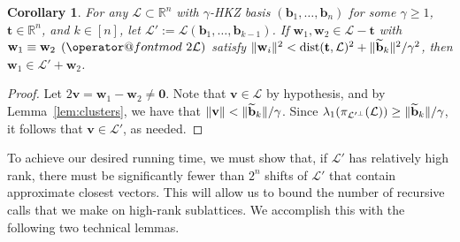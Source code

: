 \documentclass[11pt]{article}
\makeatletter
\newtheorem{corollary}[theorem]{Corollary}
\newcommand{\R}{\ensuremath{\mathbb{R}}}
\renewcommand{\vec}[1]{\ensuremath{\mathbf{#1}}}
\def\imod#1{\allowbreak\mkern8mu({\operator@font mod}\,\,#1)}
\newcommand{\lat}{\mathcal{L}}
\newcommand{\gs}[1]{\ensuremath{\widetilde{#1}}}
\DeclareMathOperator{\dist}{dist}
\DeclarePairedDelimiter\length{\lVert}{\rVert}
\makeatother
\begin{document}
\begin{corollary}
\label{cor:sparse-project}
For any $\lat \subset \R^n$ with $\gamma$-HKZ basis $(\vec{b}_1, \ldots, \vec{b}_n)$ for some $\gamma \geq 1$, $\vec{t} \in
\R^n$, and $k \in [n]$, let $\lat' := \lat(\vec{b}_1,\ldots, \vec{b}_{k-1})$.
If $\vec{w}_1, \vec{w}_2 \in \lat - \vec{t}$ with $\vec{w}_1 \equiv \vec{w}_2
\imod{2\lat}$ satisfy $\length{\vec{w}_i}^2 < \dist(\vec{t}, \lat)^2 +
\length{\gs{\vec{b}}_k}^2/\gamma^2$, then $\vec{w}_1 \in \lat' + \vec{w}_2$.
\end{corollary}
\begin{proof}
Let $2\vec{v} = \vec{w}_1 - \vec{w}_2 \neq \vec0$. Note that $\vec{v} \in \lat$ by hypothesis, and by Lemma~\ref{lem:clusters}, we have that $\| \vec{v} \| < \length{\gs{\vec{b}}_k}/\gamma $. Since $\lambda_1(\pi_{\lat^{\prime \perp}}(\lat)) \geq \length{\gs{\vec{b}}_k}/\gamma$, it follows that $\vec{v} \in \lat'$, as needed. 
\end{proof}

To achieve our desired running time, we must show that, if $\lat'$ has relatively high rank, there must be significantly fewer than $2^n$ shifts of $\lat'$ that contain approximate closest vectors. This will allow us to bound the number of recursive calls that we make on high-rank sublattices. We accomplish this with the following two technical lemmas.
\end{document}
